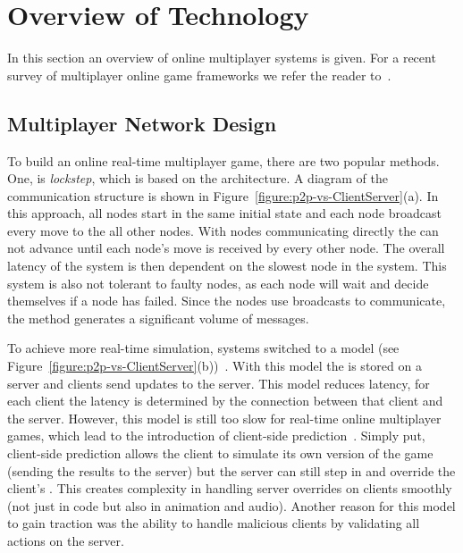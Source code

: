 
\section{Overview of Technology}

In this section an overview of online multiplayer systems is given. For a recent survey of multiplayer online game frameworks we refer the reader to~\cite{Yahyavi:2013:PAM:2522968.2522977}. 

\subsection{Multiplayer Network Design}

To build an online real-time multiplayer game, there are two popular methods.
One, is \ptoP \emph{lockstep}, which is based on the \ptoP architecture.
A diagram of the \ptoP communication structure is shown in Figure~\ref{figure:p2p-vs-ClientServer}(a).
In this approach, all nodes start in the same initial state and each node broadcast every move to the all other nodes.
With nodes communicating directly the \gamestate can not advance until each node's move is received by every other node.
The overall latency of the system is then dependent on the slowest node in the system.
This system is also not tolerant to faulty nodes, as each node will wait and decide themselves if a node has failed.
Since the nodes use broadcasts to communicate, the method generates a significant volume of messages.

To achieve more real-time simulation, systems switched to a \clientServer model (see Figure~\ref{figure:p2p-vs-ClientServer}(b))~\cite{DOOMfaq}. 
With this model the \gamestate is stored on a server and clients send updates to the server.
This model reduces latency, for each client the latency is determined by the connection between that client and the server.
However, this model is still too slow for real-time online multiplayer games, which lead to the introduction of client-side prediction~\cite{bernier2001latency}.
Simply put, client-side prediction allows the client to simulate its own version of the game (sending the results to the server) but the server can still step in and override the client's \gamestate.
This creates complexity in handling server overrides on clients smoothly (not just in code but also in animation and audio).
Another reason for this model to gain traction was the ability to handle malicious clients by validating all actions on the server.



